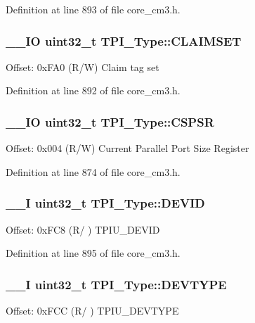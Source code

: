 Definition at line 893 of file core\-\_\-cm3.\-h.

\hypertarget{struct_t_p_i___type_a2e4d5a07fabd771fa942a171230a0a84}{
\subsubsection[{C\-L\-A\-I\-M\-S\-E\-T}]{\setlength{\rightskip}{0pt plus 5cm}\-\_\-\-\_\-\-I\-O {\bf uint32\-\_\-t} T\-P\-I\-\_\-\-Type\-::\-C\-L\-A\-I\-M\-S\-E\-T}}\label{struct_t_p_i___type_a2e4d5a07fabd771fa942a171230a0a84}
Offset\-: 0x\-F\-A0 (R/\-W) Claim tag set 

Definition at line 892 of file core\-\_\-cm3.\-h.

\hypertarget{struct_t_p_i___type_aa723ef3d38237aa2465779b3cc73a94a}{
\subsubsection[{C\-S\-P\-S\-R}]{\setlength{\rightskip}{0pt plus 5cm}\-\_\-\-\_\-\-I\-O {\bf uint32\-\_\-t} T\-P\-I\-\_\-\-Type\-::\-C\-S\-P\-S\-R}}\label{struct_t_p_i___type_aa723ef3d38237aa2465779b3cc73a94a}
Offset\-: 0x004 (R/\-W) Current Parallel Port Size Register 

Definition at line 874 of file core\-\_\-cm3.\-h.

\hypertarget{struct_t_p_i___type_a4b2e0d680cf7e26728ca8966363a938d}{
\subsubsection[{D\-E\-V\-I\-D}]{\setlength{\rightskip}{0pt plus 5cm}\-\_\-\-\_\-\-I {\bf uint32\-\_\-t} T\-P\-I\-\_\-\-Type\-::\-D\-E\-V\-I\-D}}\label{struct_t_p_i___type_a4b2e0d680cf7e26728ca8966363a938d}
Offset\-: 0x\-F\-C8 (R/ ) T\-P\-I\-U\-\_\-\-D\-E\-V\-I\-D 

Definition at line 895 of file core\-\_\-cm3.\-h.

\hypertarget{struct_t_p_i___type_a16d12c5b1e12f764fa3ec4a51c5f0f35}{
\subsubsection[{D\-E\-V\-T\-Y\-P\-E}]{\setlength{\rightskip}{0pt plus 5cm}\-\_\-\-\_\-\-I {\bf uint32\-\_\-t} T\-P\-I\-\_\-\-Type\-::\-D\-E\-V\-T\-Y\-P\-E}}\label{struct_t_p_i___type_a16d12c5b1e12f764fa3ec4a51c5f0f35}
Offset\-: 0x\-F\-C\-C (R/ ) T\-P\-I\-U\-\_\-\-D\-E\-V\-T\-Y\-P\-E 

